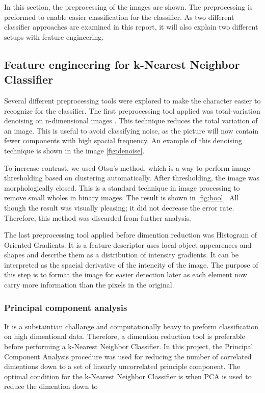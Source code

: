 \documentclass[../main.tex]{subfiles}
\begin{document}
In this section, the preprocessing of the images are shown. The preprocessing is preformed to enable easier classification for the classifier. As two different classifier approaches are examined in this report, it will also explain two different setups with feature engineering.

\subsection{Feature engineering for k-Nearest Neighbor Classifier}

Several different preprocessing tools were explored to make the character easier to recognize for the classifier. The first preprocessing tool applied was total-variation denoising on n-dimensional images \cite{dnoise_tv_chambolle}. This technique reduces the total variation of an image. This is useful to avoid classifying noise, as the picture will now contain fewer components with high spacial frequency. An example of this denoising technique is shown in the image \autoref{fig:denoise}.

To increase contrast, we used Otsu's method, which is a way to perform image thresholding based on clustering \cite{otsu} automatically. After thresholding, the image was morphologically closed. This is a standard technique in image processing to remove small wholes in binary images. The result is shown in \autoref{fig:bool}. All though the result was visually pleasing; it did not decrease the error rate. Therefore, this method was discarded from further analysis.

The last preprocessing tool applied before dimention reduction was Histogram of Oriented Gradients. It is a feature descriptor uses local object appearences and shapes and describe them as a distribution of intensity gradients. It can be interpreted as the spacial derivative of the intencity of the image. The purpose of this step is to format the image for easier detection later as each element now carry more information than the pixels in the original.

\subsubsection{Principal component analysis}

It is a substaintian challange and computationally heavy to preform classification on high dimentional data. Therefore, a dimention reduction tool is preferable before performing a k-Nearest Neighbor Classifier. In this project, the Principal Component Analysis procedure was used for reducing the number of correlated dimentions down to a set of linearly uncorrelated principle component. The optimal condition for the k-Nearest Neighbor Classifier is when PCA is used to reduce the dimention down to %
\end{document}
